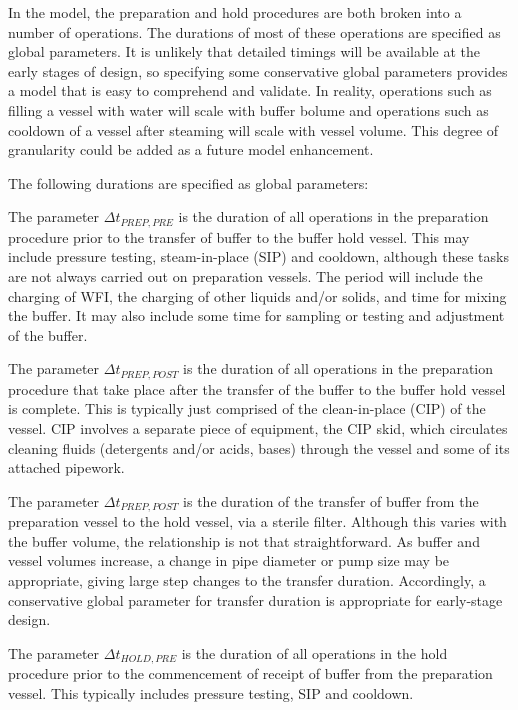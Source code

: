 In the model, the preparation and hold procedures are both broken into a number
of operations.
The durations of most of these operations are specified as global parameters.
It is unlikely that detailed timings will be available at the early stages of
design, so specifying some conservative global parameters provides a model that
is easy to comprehend and validate.
In reality, operations such as filling a vessel with water will scale with
buffer bolume and operations such as cooldown of a vessel after steaming will
scale with vessel volume.
This degree of granularity could be added as a future model enhancement.

The following durations are specified as global parameters:

The parameter $\Delta t_{\mathit{PREP,PRE}}$ is the duration of all operations
in the preparation procedure prior to the transfer of buffer to the buffer hold
vessel.  
This may include pressure testing, steam-in-place (SIP) and cooldown, although
these tasks are not always carried out on preparation vessels.
The period will include the charging of WFI, the charging of other liquids
and/or solids, and time for mixing the buffer.
It may also include some time for sampling or testing and adjustment of the
buffer.

The parameter $\Delta t_{\mathit{PREP,POST}}$ is the duration of all operations
in the preparation procedure that take place after the transfer of the buffer
to the buffer hold vessel is complete.
This is typically just comprised of the clean-in-place (CIP) of the vessel.
CIP involves a separate piece of equipment, the CIP skid, which circulates
cleaning fluids (detergents and/or acids, bases) through the vessel and some of
its attached pipework.

The parameter $\Delta t_{\mathit{PREP,POST}}$ is the duration of the transfer
of buffer from the preparation vessel to the hold vessel, via a sterile filter.
Although this varies with the buffer volume, the relationship is not that
straightforward.
As buffer and vessel volumes increase, a change in pipe diameter or pump size
may be appropriate, giving large step changes to the transfer duration.
Accordingly, a conservative global parameter for transfer duration is
appropriate for early-stage design.

The parameter $\Delta t_{\mathit{HOLD,PRE}}$ is the duration of all operations
in the hold procedure prior to the commencement of receipt of buffer from the
preparation vessel.
This typically includes pressure testing, SIP and cooldown.

